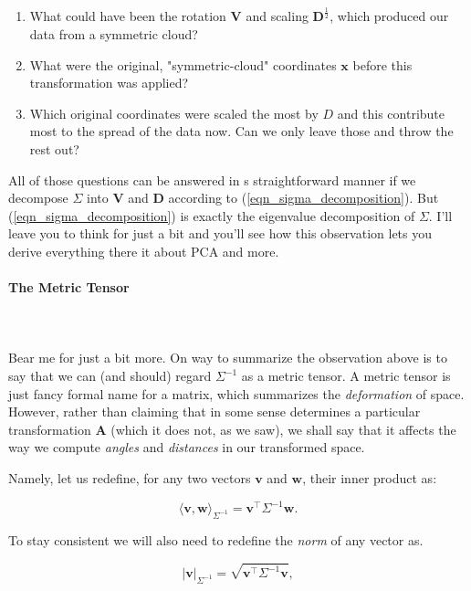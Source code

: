 \documentclass{article}
\begin{document}
\begin{enumerate}
  \item What could have been the rotation $\bm{V}$ and scaling $\bm{D}^{\frac{1}{2}}$, which produced our data from a symmetric cloud?
  \item What were the original, "symmetric-cloud" coordinates $\bm{x}$ before this transformation was applied?
  \item Which original coordinates were scaled the most by $D$ and this contribute most to the spread of the data now. Can we only leave those and throw the rest out?
\end{enumerate}

All of those questions can be answered in s straightforward manner if we decompose $\Sigma$ into $\bm{V}$ and $\bm{D}$ according to (\ref{eqn_sigma_decomposition}). But (\ref{eqn_sigma_decomposition}) is exactly the eigenvalue decomposition of $\Sigma$. I'll leave you to think for just a bit and you'll see how this observation lets you derive everything there it about PCA and more.

\paragraph{The Metric Tensor}\mbox{}\\\\
Bear me for just a bit more. On way to summarize the observation above is to say that we can (and should) regard $\Sigma^{-1}$ as a metric tensor. A metric tensor is just  fancy formal name for a matrix, which summarizes the \textit{deformation} of space. However, rather than claiming that in some sense determines a particular transformation $\bm{A}$ (which it does not, as we saw), we shall say that it affects the way we compute \textit{angles} and \textit{distances} in our transformed space.\medskip

Namely, let us redefine, for any two vectors $\bm{v}$ and $\bm{w}$, their inner product as:

\begin{equation}
  \langle\bm{v},\bm{w}\rangle_{\Sigma^{-1}} = \bm{v}^{\intercal}\Sigma^{-1}\bm{w}.
\end{equation}

To stay consistent we will also need to redefine the  \textit{norm} of any vector as.

\begin{equation}
  |\bm{v}|_{\Sigma^{-1}} = \sqrt{\bm{v}^{\intercal}\Sigma^{-1}\bm{v}},
\end{equation}
\end{document}

